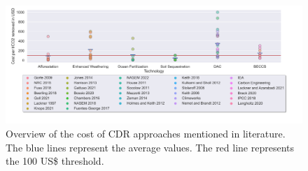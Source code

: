 \begin{figure}
\captionsetup{margin=3.5cm}
    \centering
    \includegraphics[width=550pt]{figures/cost.png}
    \caption{Overview of the cost of CDR approaches mentioned in literature. The blue lines represent the average values. The red line represents the 100 US\$ threshold.}
    \label{fig:awesome_image}
\end{figure}

\nocite{House2011EconomicAir, Aumont2006GlobalizingStudies, Buesseler2008OceanUncertainty, Cao2010ImportanceChange, Oschlies2010ClimateApprentice, Beringer2011BioenergyConstraints, Rogner2012EnergyPotentials, Krey2014GlobalReview, Cornelissen2012TheSystem}
\nocite{Cornelissen2012TheSystem, Mazzotti2013DirectContactor, Socolow2011DirectAffairs, Zeman2014ReducingCO2, Nemet2011WillingnessCapture, Kulkarni2012AnalysisAir, Stolaroff2008CarbonSpray}
\nocite{McKinsey2020ClimateTake, Liu2023Monitoring2022}